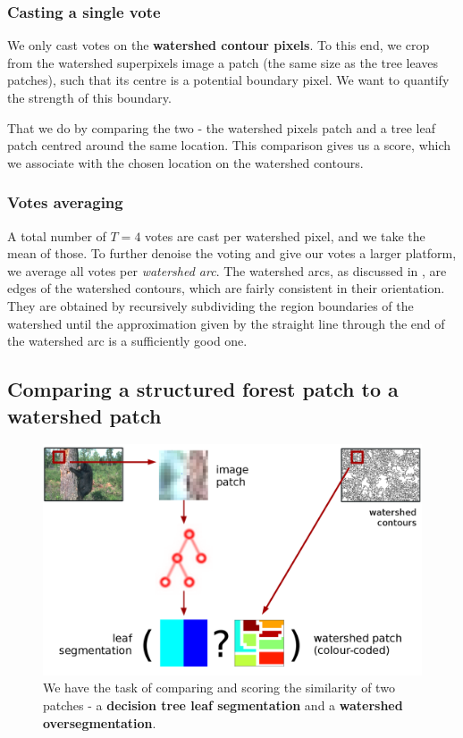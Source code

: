\subsubsection{Casting a single vote}
We only cast votes on the {\bf watershed contour pixels}. To this end, we crop from the watershed superpixels image a patch (the same size as the tree leaves patches), such that its centre is a potential boundary pixel. We want to quantify the strength of this boundary. 

That we do by comparing the two - the watershed pixels patch and a tree leaf patch centred around the same location. This comparison gives us a score, which we associate with the chosen location on the watershed contours.

\subsubsection{Votes averaging}
A total number of $T=4$ votes are cast per watershed pixel, and we take the mean of those. To further denoise the voting and give our votes a larger platform, %
we average all votes per \textit{watershed arc}. The watershed arcs, as discussed in , are edges of the watershed contours, which are fairly consistent in their orientation. They are obtained by recursively subdividing the region boundaries of the watershed until the approximation given by the straight line through the end of the watershed arc is a sufficiently good one. %

\subsection{Comparing a structured forest patch to a watershed patch}
\begin{figure}[t]
\centering
 \includegraphics[width=1\textwidth]{images/SE-SV-UCM/weighting-the-watershed-contours-two-patches.png}
\caption[Structured voting essence: a comparison of two patches]{We have the task of comparing and scoring the similarity of two patches - a \textbf{decision tree leaf segmentation} and a \textbf{watershed oversegmentation}.}
\label{fig:weighting-the-watershed-contours}
\end{figure}

